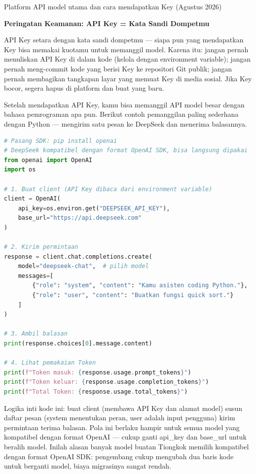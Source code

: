 \begin{center}\small\color{gray}Platform API model utama dan cara mendapatkan Key (Agustus 2026)\end{center}

\textbf{Peringatan Keamanan: API Key = Kata Sandi Dompetmu}\par

API Key setara dengan kata sandi dompetmu — siapa pun yang mendapatkan Key bisa memakai kuotamu untuk memanggil model. Karena itu: jangan pernah menuliskan API Key di dalam kode (kelola dengan environment variable); jangan pernah meng-commit kode yang berisi Key ke repositori Git publik; jangan pernah membagikan tangkapan layar yang memuat Key di media sosial. Jika Key bocor, segera hapus di platform dan buat yang baru.


Setelah mendapatkan API Key, kamu bisa memanggil API model besar dengan bahasa pemrograman apa pun. Berikut contoh pemanggilan paling sederhana dengan Python — mengirim satu pesan ke DeepSeek dan menerima balasannya.

\begin{lstlisting}[language=Python]
# Pasang SDK: pip install openai
# DeepSeek kompatibel dengan format OpenAI SDK, bisa langsung dipakai
from openai import OpenAI
import os

# 1. Buat client (API Key dibaca dari environment variable)
client = OpenAI(
    api_key=os.environ.get("DEEPSEEK_API_KEY"),
    base_url="https://api.deepseek.com"
)

# 2. Kirim permintaan
response = client.chat.completions.create(
    model="deepseek-chat",  # pilih model
    messages=[
        {"role": "system", "content": "Kamu asisten coding Python."},
        {"role": "user", "content": "Buatkan fungsi quick sort."}
    ]
)

# 3. Ambil balasan
print(response.choices[0].message.content)

# 4. Lihat pemakaian Token
print(f"Token masuk: {response.usage.prompt_tokens}")
print(f"Token keluar: {response.usage.completion_tokens}")
print(f"Total Token: {response.usage.total_tokens}")
\end{lstlisting}

Logika inti kode ini: buat client (membawa API Key dan alamat model) susun daftar pesan (system menentukan peran, user adalah input pengguna) kirim permintaan terima balasan. Pola ini berlaku hampir untuk semua model yang kompatibel dengan format OpenAI — cukup ganti api\_key dan base\_url untuk beralih model. Inilah alasan banyak model buatan Tiongkok memilih kompatibel dengan format OpenAI SDK: pengembang cukup mengubah dua baris kode untuk berganti model, biaya migrasinya sangat rendah.

